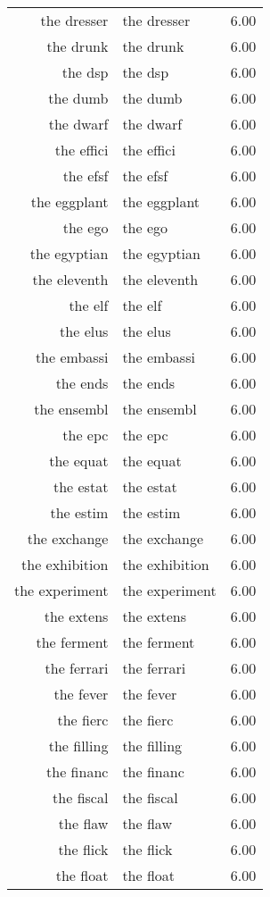 \begin{table}[ht]
\begin{tabular}{rlr}
  the dresser & the dresser & 6.00 \\ 
  the drunk & the drunk & 6.00 \\ 
  the dsp & the dsp & 6.00 \\ 
  the dumb & the dumb & 6.00 \\ 
  the dwarf & the dwarf & 6.00 \\ 
  the effici & the effici & 6.00 \\ 
  the efsf & the efsf & 6.00 \\ 
  the eggplant & the eggplant & 6.00 \\ 
  the ego & the ego & 6.00 \\ 
  the egyptian & the egyptian & 6.00 \\ 
  the eleventh & the eleventh & 6.00 \\ 
  the elf & the elf & 6.00 \\ 
  the elus & the elus & 6.00 \\ 
  the embassi & the embassi & 6.00 \\ 
  the ends & the ends & 6.00 \\ 
  the ensembl & the ensembl & 6.00 \\ 
  the epc & the epc & 6.00 \\ 
  the equat & the equat & 6.00 \\ 
  the estat & the estat & 6.00 \\ 
  the estim & the estim & 6.00 \\ 
  the exchange & the exchange & 6.00 \\ 
  the exhibition & the exhibition & 6.00 \\ 
  the experiment & the experiment & 6.00 \\ 
  the extens & the extens & 6.00 \\ 
  the ferment & the ferment & 6.00 \\ 
  the ferrari & the ferrari & 6.00 \\ 
  the fever & the fever & 6.00 \\ 
  the fierc & the fierc & 6.00 \\ 
  the filling & the filling & 6.00 \\ 
  the financ & the financ & 6.00 \\ 
  the fiscal & the fiscal & 6.00 \\ 
  the flaw & the flaw & 6.00 \\ 
  the flick & the flick & 6.00 \\ 
  the float & the float & 6.00 \\ 

\end{tabular}
\end{table}
